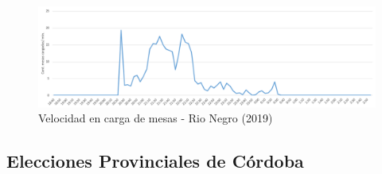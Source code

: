 \begin{figure}[h!]
  \includegraphics[width=1\textwidth]{img/8w25IVQD5U.png}
  \caption{Velocidad en carga de mesas - Rio Negro (2019)}
  \label{graf:velocidadRioNegro}
\end{figure}

\subsection{Elecciones Provinciales de Córdoba}


